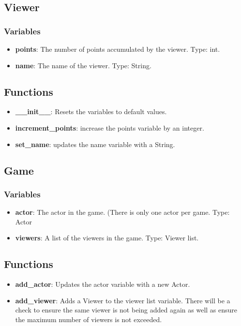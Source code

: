 \documentclass{article}
\begin{document}
\subsection{Viewer}
\subsubsection{Variables}

\begin{itemize}
	\item \textbf{points}: The number of points accumulated by the viewer. Type: int.

	\item \textbf{name}: The name of the viewer. Type: String.

\end{itemize}

\subsection{Functions}

\begin{itemize}

	\item \textbf{\_\_init\_\_}: Resets the variables to default values.

	\item \textbf{increment\_points}: increase the points variable by an integer.
	
	\item \textbf{set\_name}: updates the name variable with a String.
	
\end{itemize}

\subsection{Game}
\subsubsection{Variables}
\begin{itemize}
	\item \textbf{actor}: The actor in the game. (There is only one actor per game. Type: Actor
	
	\item \textbf{viewers}: A list of the viewers in the game. Type: Viewer list.
	
\end{itemize}

\subsection{Functions}
\begin{itemize}

	\item \textbf{add\_actor}: Updates the actor variable with a new Actor.
	
	\item \textbf{add\_viewer}: Adds a Viewer to the viewer list variable. There will be a check to ensure the same viewer is not being added again as well as ensure the maximum number of viewers is not exceeded.
	
\end{itemize}
\end{document}
